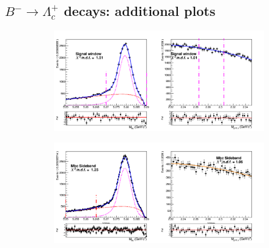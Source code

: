 %

\subsection{$B^- \rightarrow \Lambda_c^+$ decays: additional plots}
\label{sec:chargedBtoLamApp}



\begin{figure}[H]
  \begin{subfigure}{15cm}
    \centering\includegraphics[width=14cm]{A1-Appendix/figs/Signal_window_streams12345_Generic_charged_corrLambdaC_2Dfit.png}
  \end{subfigure}
  \begin{subfigure}{15cm}
    \centering\includegraphics[width=14cm]{A1-Appendix/figs/Mbc_Sideband_stream12345_Generic_charged_corrLambdaC_2Dfit.png}
  \end{subfigure}


\end{figure}
